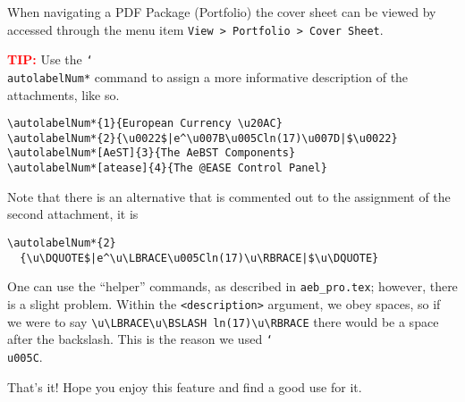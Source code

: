 \documentclass{article}
\newcommand{\cs}[1]{\texttt{\char`\\#1}}
\newcommand\newtopic{\par\ifdim\lastskip>0pt\relax\vskip-\lastskip\fi
\par\vskip6pt\noindent}
\begin{document}
When navigating a PDF Package (Portfolio) the cover sheet can be viewed by
accessed through the menu item \texttt{View > Portfolio > Cover Sheet}.

\newtopic\textbf{\textcolor{red}{TIP:}} Use the \cs{autolabelNum*}
command to assign a more informative description of the attachments,
like so.
\begin{Verbatim}[xleftmargin=\parindent,fontsize=\small]
\autolabelNum*{1}{European Currency \u20AC}
\autolabelNum*{2}{\u0022$|e^\u007B\u005Cln(17)\u007D|$\u0022}
\autolabelNum*[AeST]{3}{The AeBST Components}
\autolabelNum*[atease]{4}{The @EASE Control Panel}
\end{Verbatim}
Note that there is an alternative that is commented out to the assignment of the
second attachment, it is
\begin{Verbatim}[xleftmargin=\parindent,fontsize=\small]
\autolabelNum*{2}
  {\u\DQUOTE$|e^\u\LBRACE\u005Cln(17)\u\RBRACE|$\u\DQUOTE}
\end{Verbatim}
One can use the ``helper'' commands, as described in \texttt{aeb\_pro.tex}; however,
there is a slight problem.  Within the \texttt{<description>} argument, we obey spaces, so
if we were to say \verb!\u\LBRACE\u\BSLASH ln(17)\u\RBRACE! there would be a space
after the backslash. This is the reason we used \cs{u005C}.

\newtopic That's it!  Hope you enjoy this feature and find a good
use for it.
\end{document}
